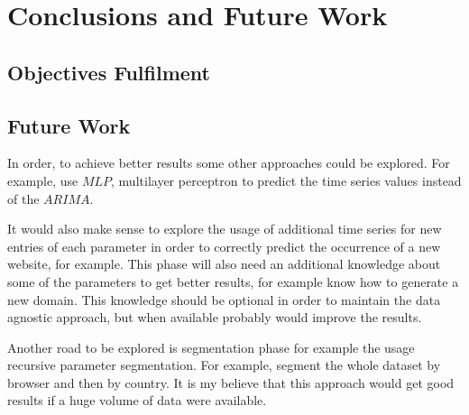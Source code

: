\chapter{Conclusions and Future Work} \label{chap:concl}

\section*{}

\section{Objectives Fulfilment}


\section{Future Work}

In order, to achieve better results some other approaches could be explored. For
example, use $MLP$, multilayer perceptron to predict the time series values
instead of the $ARIMA$.

It would also make sense to explore the usage of additional time series for new
entries of each parameter in order to correctly predict the occurrence of a new
website, for example. This phase will also need an additional knowledge about
some of the parameters to get better results, for example know how to generate a
new domain. This knowledge should be optional in order to maintain the data
agnostic approach, but when available probably would improve the results.

Another road to be explored is segmentation phase for example the usage
recursive parameter segmentation. For example, segment the whole dataset by
browser and then by country. It is my believe that this approach would get good
results if a huge volume of data were available.

